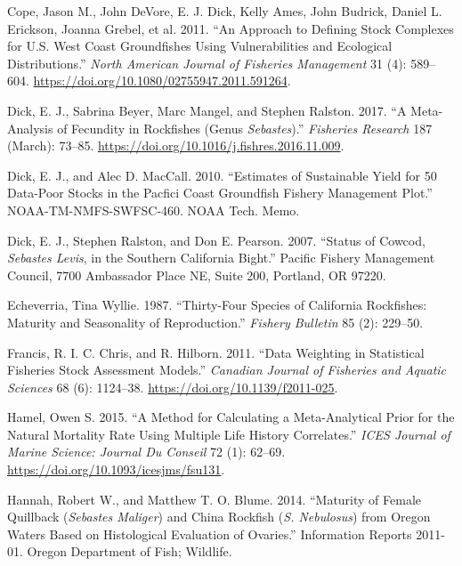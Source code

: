 \documentclass[11pt,
  english,
  a4paper,
]{article}
\begin{document}
\leavevmode\hypertarget{ref-cope_approach_2011}{}%
Cope, Jason M., John DeVore, E. J. Dick, Kelly Ames, John Budrick, Daniel L. Erickson, Joanna Grebel, et al. 2011. ``An Approach to Defining Stock Complexes for U.S. West Coast Groundfishes Using Vulnerabilities and Ecological Distributions.'' \emph{North American Journal of Fisheries Management} 31 (4): 589--604. \url{https://doi.org/10.1080/02755947.2011.591264}.

\leavevmode\hypertarget{ref-dick_meta-analysis_2017}{}%
Dick, E. J., Sabrina Beyer, Marc Mangel, and Stephen Ralston. 2017. ``A Meta-Analysis of Fecundity in Rockfishes (Genus \emph{Sebastes}).'' \emph{Fisheries Research} 187 (March): 73--85. \url{https://doi.org/10.1016/j.fishres.2016.11.009}.

\leavevmode\hypertarget{ref-DickandMacCall_dbsra_2010}{}%
Dick, E. J., and Alec D. MacCall. 2010. ``Estimates of Sustainable Yield for 50 Data-Poor Stocks in the Pacfici Coast Groundfish Fishery Management Plot.'' NOAA-TM-NMFS-SWFSC-460. NOAA Tech. Memo.

\leavevmode\hypertarget{ref-dick_status_2007}{}%
Dick, E. J., Stephen Ralston, and Don E. Pearson. 2007. ``Status of Cowcod, \emph{Sebastes Levis}, in the Southern California Bight.'' Pacific Fishery Management Council, 7700 Ambassador Place NE, Suite 200, Portland, OR 97220.

\leavevmode\hypertarget{ref-Echeverria_maturity_1987}{}%
Echeverria, Tina Wyllie. 1987. ``Thirty-Four Species of California Rockfishes: Maturity and Seasonality of Reproduction.'' \emph{Fishery Bulletin} 85 (2): 229--50.

\leavevmode\hypertarget{ref-francis_data_2011}{}%
Francis, R. I. C. Chris, and R. Hilborn. 2011. ``Data Weighting in Statistical Fisheries Stock Assessment Models.'' \emph{Canadian Journal of Fisheries and Aquatic Sciences} 68 (6): 1124--38. \url{https://doi.org/10.1139/f2011-025}.

\leavevmode\hypertarget{ref-hamel_method_2015}{}%
Hamel, Owen S. 2015. ``A Method for Calculating a Meta-Analytical Prior for the Natural Mortality Rate Using Multiple Life History Correlates.'' \emph{ICES Journal of Marine Science: Journal Du Conseil} 72 (1): 62--69. \url{https://doi.org/10.1093/icesjms/fsu131}.

\leavevmode\hypertarget{ref-HannahandBlume_maturity_2011}{}%
Hannah, Robert W., and Matthew T. O. Blume. 2014. ``Maturity of Female Quillback (\emph{Sebastes Maliger}) and China Rockfish (\emph{S. Nebulosus}) from Oregon Waters Based on Histological Evaluation of Ovaries.'' Information Reports 2011-01. Oregon Department of Fish; Wildlife.
\end{document}
